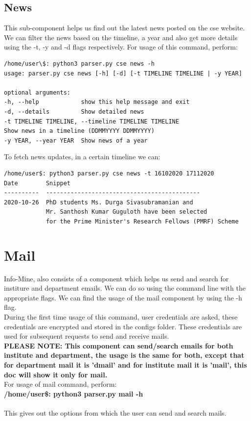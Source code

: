 \documentclass[12pt, letterpaper, twoside]{article}
\begin{document}
\subsection{News}
This sub-component helps us find out the latest news posted on the cse website.
We can filter the news based on the timeline, a year and also get more details using the -t, -y and -d flags respectively.
For usage of this command, perform:
\begin{verbatim}
/home/user\$: python3 parser.py cse news -h
usage: parser.py cse news [-h] [-d] [-t TIMELINE TIMELINE | -y YEAR]

optional arguments:
-h, --help            show this help message and exit
-d, --details         Show detailed news
-t TIMELINE TIMELINE, --timeline TIMELINE TIMELINE
Show news in a timeline (DDMMYYYY DDMMYYYY)
-y YEAR, --year YEAR  Show news of a year   
\end{verbatim}
To fetch news updates, in a certain timeline we can:
\begin{verbatim}
/home/user$: python3 parser.py cse news -t 16102020 17112020
Date        Snippet
----------  --------------------------------------------
2020-10-26  PhD students Ms. Durga Sivasubramanian and 
            Mr. Santhosh Kumar Guguloth have been selected 
            for the Prime Minister's Research Fellows (PMRF) Scheme

\end{verbatim}
\section{Mail}
Info-Mine, also consists of a component which helps us send and search for institure and department emails. We can do so using the command line with the appropriate flags. We can find the usage of the mail component by using the -h flag.\\
During the first time usage of this command, user credentials are asked, these credentials are encrypted and stored in the configs folder. These credentials are used for subsequent requests to send and receive mails.\\
\textbf{PLEASE NOTE: This component can send/search emails for both institute and department, the usage is the same for both, except that for department mail it is 'dmail' and for institute mail it is 'mail', this doc will show it only for mail.}\\
For usage of mail command, perform:\\
\textbf{/home/user\$: python3 parser.py mail -h}\\
\\
This gives out the options from which the user can send and search mails.
\end{document}
